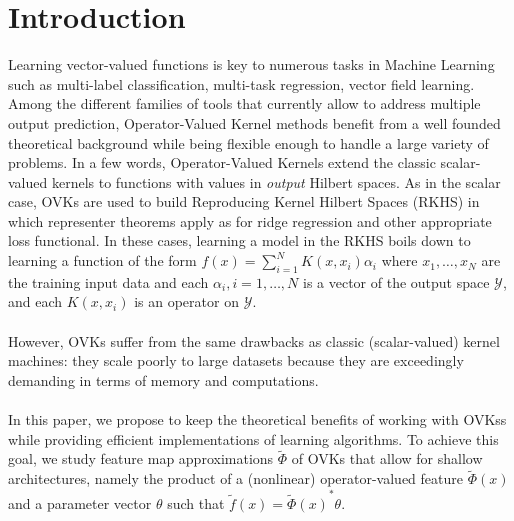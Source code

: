 \documentclass[twoside,11pt]{article}
\begin{document}

\section{Introduction}
Learning vector-valued functions is key to numerous tasks in Machine Learning
such as multi-label classification, multi-task regression, vector field
learning.  Among the different families of tools \cite{Goodfellow} that currently allow to
address multiple output prediction, Operator-Valued Kernel methods
\citep{Micchelli2005,Carmeli2010,Kadri_aistat10, Brouard2011,Alvarez2012}
benefit from a well founded theoretical background while being flexible enough
to handle a large variety of problems. In a few words, Operator-Valued Kernels
extend the classic scalar-valued kernels to functions with values in
\emph{output} Hilbert spaces. As in the scalar case, \acfp{OVK} are used to
build Reproducing Kernel Hilbert Spaces (\acs{RKHS}) in which representer
theorems apply as for ridge regression and other appropriate loss functional. In
these cases, learning a model in the \acs{RKHS} boils down to learning a
function of the form $f(x)=\sum_{i=1}^N K(x,x_i)\alpha_i$ where $x_1, \ldots,
x_N$ are the training input data and each $\alpha_i, i=1, \ldots, N$ is a
vector of the output space $\mathcal{Y}$, and each $K(x,x_i)$ is an operator on
$\mathcal{Y}$.  \paragraph{} However, \acsp{OVK} suffer from the same drawbacks
as classic (sca\-lar-va\-lued) kernel machines: they scale poorly to large
datasets because they are exceedingly demanding in terms of memory and
computations.

\paragraph{}
In this paper, we propose to keep the theoretical benefits of working with
\acsp{OVK}s while providing efficient implementations of learning algorithms.
To achieve this goal, we study feature map approximations $\widetilde{\Phi}$ of
\acsp{OVK} that allow for shallow architectures, namely the product of a
(nonlinear) operator-valued feature $\widetilde{\Phi}(x)$ and a parameter
vector $\theta$ such that $\widetilde{f}(x) = {\widetilde{\Phi}(x)}^* \theta$.
\end{document}

